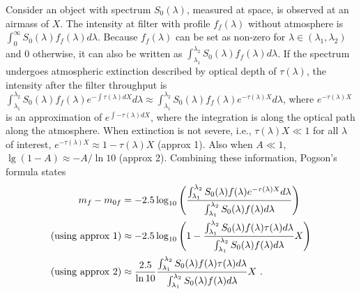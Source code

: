 Consider an object with spectrum $ S_0(\lambda) $, measured at space, is observed at an airmass of $ X $. The intensity at filter with profile $ f_f(\lambda) $ without atmosphere is $ \int_{0}^{\infty} S_0(\lambda) f_f(\lambda) d\lambda $. Because $ f_f(\lambda) $ can be set as non-zero for $ \lambda \in (\lambda_1, \lambda_2) $ and 0 otherwise, it can also be written as $ \int_{\lambda_1}^{\lambda_2} S_0(\lambda) f_f(\lambda) d\lambda $. If the spectrum undergoes atmospheric extinction described by optical depth of $ \tau(\lambda) $, the intensity after the filter throughput is $ \int_{\lambda_1}^{\lambda_2} S_0(\lambda) f_f(\lambda)  e^{-\int \tau(\lambda) dX} d\lambda \approx \int_{\lambda_1}^{\lambda_2} S_0(\lambda) f_f(\lambda)  e^{-\tau(\lambda) X} d\lambda$, where $ e^{-\tau(\lambda) X} $ is an approximation of $ e^{\int -\tau(\lambda) dX} $, where the integration is along the optical path along the atmosphere. When extinction is not severe, i.e., $ \tau(\lambda) X \ll 1 $ for all $ \lambda $ of interest, $ e^{-\tau(\lambda) X} \approx 1 - \tau(\lambda) X $ (approx 1). Also when $ A \ll 1 $, $ \lg (1 - A) \approx - A / \ln 10 $ (approx 2). Combining these information, Pogson's formula states
\begin{equation}
\begin{aligned}
  m_f - m_{0f}
    &= -2.5 \log_{10}
      \qty( \frac{\int_{\lambda_1}^{\lambda_2} S_0(\lambda) f(\lambda) e^{-\tau(\lambda) X} d\lambda}
      {\int_{\lambda_1}^{\lambda_2} S_0(\lambda) f(\lambda) d\lambda} ) \\
    \mathrm{(using\ approx\ 1)}
    &\approx -2.5 \log_{10} 
      \qty( 1 - \frac{\int_{\lambda_1}^{\lambda_2} S_0(\lambda) f(\lambda) \tau(\lambda) d\lambda}
        {\int_{\lambda_1}^{\lambda_2} S_0(\lambda) f(\lambda) d\lambda} X ) \\
    \mathrm{(using\ approx\ 2)}
    &\approx \frac{2.5}{\ln 10} 
      \frac{\int_{\lambda_1}^{\lambda_2} S_0(\lambda) f(\lambda) \tau(\lambda) d\lambda}
        {\int_{\lambda_1}^{\lambda_2} S_0(\lambda) f(\lambda) d\lambda} X ~.
\end{aligned}
\end{equation}

